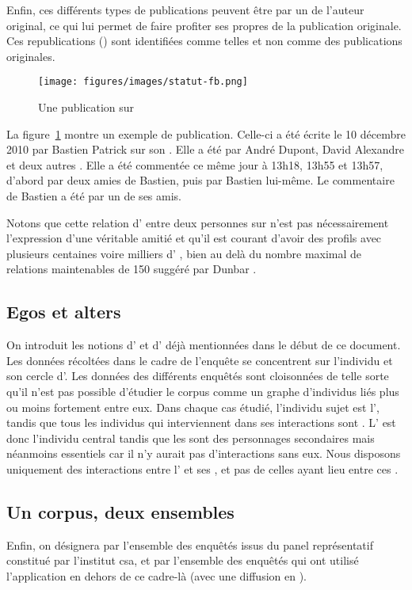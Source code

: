 Enfin, ces différents types de publications peuvent être  par un
 de l’auteur original, ce qui lui permet de faire profiter ses propres
 de la publication originale. Ces republications () sont
identifiées comme telles et non comme des publications originales.

\begin{figure}[ht]
    \begin{center}
        \texttt{[image: figures/images/statut-fb.png]}
    \end{center}
    \caption{\label{statut-fb}Une publication sur \fb}
\end{figure}

La figure~\ref{statut-fb} montre un exemple de publication. Celle-ci a été
écrite le 10 décembre 2010 par Bastien Patrick sur son . Elle a été
 par André Dupont, David Alexandre et deux autres . Elle a été
commentée ce même jour à 13h18, 13h55 et 13h57, d’abord par deux amies de
Bastien, puis par Bastien lui-même. Le commentaire de Bastien a été 
par un de ses amis.

Notons que cette relation d’ entre deux personnes sur \fb{} n’est pas
nécessairement l’expression d’une véritable amitié et qu’il est courant d’avoir
des profils avec plusieurs centaines voire milliers d’
\citep{Hogan2010}, bien au delà du nombre maximal de relations maintenables
de 150 suggéré par Dunbar \citep{Dunbar2012,Roberts2011}.

\subsection{Egos et alters}

On introduit les notions d’ et d’ déjà mentionnées dans le
début de ce document. Les données récoltées dans le cadre de l’enquête
 se concentrent sur l’individu et son cercle d’. Les
données des différents enquêtés sont cloisonnées de telle sorte qu’il n’est pas
possible d’étudier le corpus comme un graphe d’individus liés plus ou moins
fortement entre eux. Dans chaque cas étudié, l’individu sujet est l’,
tandis que tous les individus qui interviennent dans ses interactions sont
 . L’ est donc l’individu central tandis que les
 sont des personnages secondaires mais néanmoins essentiels car il
n’y aurait pas d’interactions sans eux. Nous disposons uniquement des
interactions entre l’ et ses , et pas de celles ayant lieu
entre ces .

\subsection{Un corpus, deux ensembles}

Enfin, on désignera par  l’ensemble des enquêtés issus du
panel représentatif constitué par l’institut {\sc csa}, et par 
l’ensemble des enquêtés qui ont utilisé l’application en dehors de ce cadre-là
(avec une diffusion en ).
